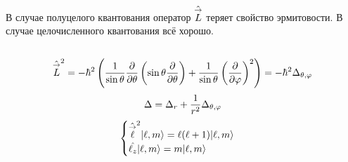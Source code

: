 В случае полуцелого квантования оператор $\hat{\overset{\to}{L}}$ теряет свойство эрмитовости. В случае целочисленного квантования всё хорошо.

\subsection{}
$$
    \hat{\overset{\to}{L}}^2 = -\hbar^2 \left(
        \dfrac{1}{\sin \theta} \dfrac{\partial }{\partial \theta} \left(
            \sin \theta \dfrac{\partial }{\partial \theta}
        \right) +
        \dfrac{1}{\sin \theta} \left(\dfrac{\partial }{\partial \varphi}\right)^2
    \right) = -\hbar^2 \Delta_{\theta, \varphi}
$$
$$
    \Delta = \Delta_r + \dfrac{1}{r^2} \Delta_{\theta, \varphi}
$$
\def \hvl {\Hat {\vec \ell}}
\def \qlm {\qu{\ell, m}}
\def \lz {\Hat{\ell_z}}
$$
    \begin{cases}
        \hvl^2 \qlm  = \ell (\ell + 1) \qlm\\
        \lz \qlm = m \qlm
    \end{cases}
$$
\endgroup

